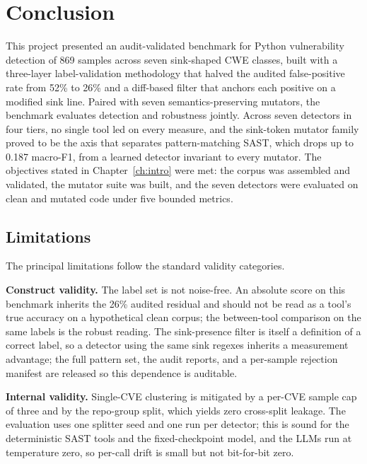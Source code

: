 \chapter{Conclusion}
\label{ch:conclusion}

This project presented an audit-validated benchmark for Python vulnerability
detection of 869 samples across seven sink-shaped CWE classes, built with a
three-layer label-validation methodology that halved the audited false-positive
rate from 52\% to 26\% and a diff-based filter that anchors each positive on a
modified sink line. Paired with seven semantics-preserving mutators, the
benchmark evaluates detection and robustness jointly. Across seven detectors in
four tiers, no single tool led on every measure, and the sink-token mutator
family proved to be the axis that separates pattern-matching SAST, which drops
up to 0.187 macro-F1, from a learned detector invariant to every mutator. The
objectives stated in Chapter~\ref{ch:intro} were met: the corpus was assembled
and validated, the mutator suite was built, and the seven detectors were
evaluated on clean and mutated code under five bounded metrics.


\section{Limitations}

The principal limitations follow the standard validity categories.

\textbf{Construct validity.} The label set is not noise-free. An absolute score
on this benchmark inherits the 26\% audited residual and should not be read as a
tool's true accuracy on a hypothetical clean corpus; the between-tool comparison
on the same labels is the robust reading. The sink-presence filter is itself a
definition of a correct label, so a detector using the same sink regexes
inherits a measurement advantage; the full pattern set, the audit reports, and a
per-sample rejection manifest are released so this dependence is auditable.

\textbf{Internal validity.} Single-CVE clustering is mitigated by a per-CVE
sample cap of three and by the repo-group split, which yields zero cross-split
leakage. The evaluation uses one splitter seed and one run per detector; this is
sound for the deterministic SAST tools and the fixed-checkpoint model, and the
LLMs run at temperature zero, so per-call drift is small but not bit-for-bit
zero.

